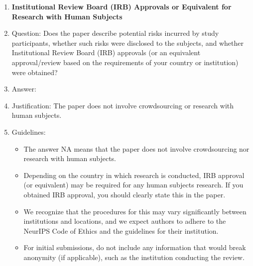 \documentclass{article}
\theoremstyle{plain}
\theoremstyle{definition}
\theoremstyle{remark}
\begin{document}
\begin{enumerate}
\item {\bf Institutional Review Board (IRB) Approvals or Equivalent for Research with Human Subjects}
    \item[] Question: Does the paper describe potential risks incurred by study participants, whether such risks were disclosed to the subjects, and whether Institutional Review Board (IRB) approvals (or an equivalent approval/review based on the requirements of your country or institution) were obtained?
    \item[] Answer: \answerNA{} %
    \item[] Justification: The paper does not involve crowdsourcing or research with human subjects.
    \item[] Guidelines:
    \begin{itemize}
        \item The answer NA means that the paper does not involve crowdsourcing nor research with human subjects.
        \item Depending on the country in which research is conducted, IRB approval (or equivalent) may be required for any human subjects research. If you obtained IRB approval, you should clearly state this in the paper. 
        \item We recognize that the procedures for this may vary significantly between institutions and locations, and we expect authors to adhere to the NeurIPS Code of Ethics and the guidelines for their institution. 
        \item For initial submissions, do not include any information that would break anonymity (if applicable), such as the institution conducting the review.
    \end{itemize}

\end{enumerate}


\end{document}
